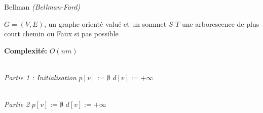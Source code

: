 \documentclass{article}      %
\begin{document}
\begin{algorithm} \caption{Bellman \textit{(Bellman-Ford)}}
\begin{algorithmic}
\Require $G = (V, E)$, un graphe orienté valué et un sommet $S$
\Ensure $T$ une arborescence de plus court chemin ou Faux si pas possible

\State \textbf{Complexité:} $O(nm)$

\\ \State \textit{Partie 1 : Initialisation}
    \State $p[v] := \emptyset$
    \State $d[v] := +\infty$
\EndFor


\\ \State \textit{Partie 2}
    \State $p[v] := \emptyset$
    \State $d[v] := +\infty$
\EndFor
\end{algorithmic}
\end{algorithm}
\end{document}
